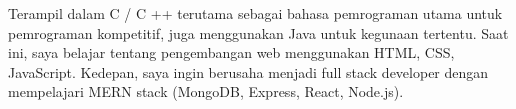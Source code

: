 

\begin{cvparagraph}

Terampil dalam C / C ++ terutama sebagai bahasa pemrograman utama untuk pemrograman kompetitif, juga menggunakan Java untuk kegunaan tertentu. Saat ini, saya belajar tentang pengembangan web menggunakan HTML, CSS, JavaScript. Kedepan, saya ingin berusaha menjadi full stack developer dengan mempelajari MERN stack (MongoDB, Express, React, Node.js).
\end{cvparagraph}
